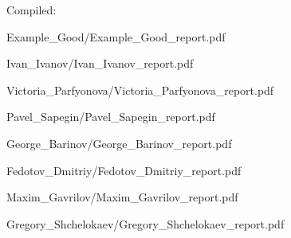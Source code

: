 \documentclass[a4paper]{article}
\begin{document}
Compiled: \DTMnow
\tableofcontents

\clearpage

{Example_Good/Example_Good_report.pdf}

{Ivan_Ivanov/Ivan_Ivanov_report.pdf}

{Victoria_Parfyonova/Victoria_Parfyonova_report.pdf}

{Pavel_Sapegin/Pavel_Sapegin_report.pdf}

{George_Barinov/George_Barinov_report.pdf}

{Fedotov_Dmitriy/Fedotov_Dmitriy_report.pdf}

{Maxim_Gavrilov/Maxim_Gavrilov_report.pdf}

{Gregory_Shchelokaev/Gregory_Shchelokaev_report.pdf}
\end{document}
